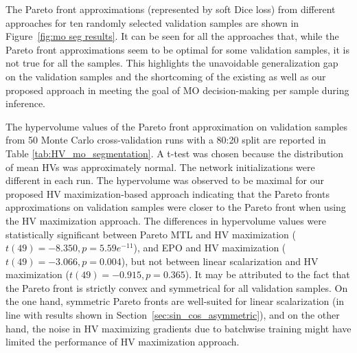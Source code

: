 The Pareto front approximations (represented by soft Dice loss) from different approaches for ten randomly selected validation samples are shown in Figure~\ref{fig:mo seg results}. It can be seen for all the approaches that, while the Pareto front approximations seem to be optimal for some validation samples, it is not true for all the samples. This highlights the unavoidable generalization gap on the validation samples and the shortcoming of the existing as well as our proposed approach in meeting the goal of MO decision-making per sample during inference.

The hypervolume values of the Pareto front approximation on validation samples from 50 Monte Carlo cross-validation runs with a 80:20 split are reported in Table \ref{tab:HV_mo_segmentation}. A t-test was chosen because the distribution of mean HVs was approximately normal. The network initializations were different in each run. The hypervolume was observed to be maximal for our proposed HV maximization-based approach indicating that the Pareto fronts approximations on validation samples were closer to the Pareto front when using the HV maximization approach. The differences in hypervolume values were statistically significant between  Pareto MTL and HV maximization ($t(49)=-8.350, p=5.59e^{-11}$), and EPO and HV maximization ($t(49)=-3.066, p=0.004$), but not between linear scalarization and HV maximization ($t(49)=-0.915, p=0.365$). It may be attributed to the fact that the Pareto front is strictly convex and symmetrical for all validation samples. On the one hand, symmetric Pareto fronts are well-suited for linear scalarization (in line with results shown in Section~\ref{sec:sin_cos_asymmetric}), and on the other hand, the noise in HV maximizing gradients due to batchwise training might have limited the performance of HV maximization approach. 

